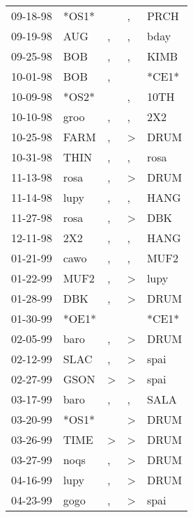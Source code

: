 \begin{supertabular}{lllll}
 09-18-98 &  *OS1* &                  &             , &   PRCH \\
 09-19-98 &    AUG &                , &             , &   bday \\
 09-25-98 &    BOB &                , &             , &   KIMB \\
 10-01-98 &    BOB &                , &               &  *CE1* \\
 10-09-98 &  *OS2* &                  &             , &   10TH \\
 10-10-98 &   groo &                , &             , &    2X2 \\
 10-25-98 &   FARM &                , &  \textgreater &   DRUM \\
 10-31-98 &   THIN &                , &             , &   rosa \\
 11-13-98 &   rosa &                , &  \textgreater &   DRUM \\
 11-14-98 &   lupy &                , &             , &   HANG \\
 11-27-98 &   rosa &                , &  \textgreater &    DBK \\
 12-11-98 &    2X2 &                , &             , &   HANG \\
 01-21-99 &   cawo &                , &             , &   MUF2 \\
 01-22-99 &   MUF2 &                , &  \textgreater &   lupy \\
 01-28-99 &    DBK &                , &  \textgreater &   DRUM \\
 01-30-99 &  *OE1* &                  &               &  *CE1* \\
 02-05-99 &   baro &                , &  \textgreater &   DRUM \\
 02-12-99 &   SLAC &                , &  \textgreater &   spai \\
 02-27-99 &   GSON &     \textgreater &  \textgreater &   spai \\
 03-17-99 &   baro &                , &             , &   SALA \\
 03-20-99 &  *OS1* &                  &  \textgreater &   DRUM \\
 03-26-99 &   TIME &     \textgreater &  \textgreater &   DRUM \\
 03-27-99 &   noqs &                , &  \textgreater &   DRUM \\
 04-16-99 &   lupy &                , &  \textgreater &   DRUM \\
 04-23-99 &   gogo &                , &  \textgreater &   spai \\

\end{supertabular}

